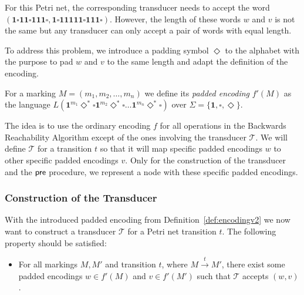 For this Petri net, the corresponding transducer needs to accept the word \break ${(\bm{1 \square 11 \square 111 \square},\bm{1 \square 11111 \square 111 \square})}$. However, the length of these words $w$ and $v$ is not the same but any transducer can only accept a pair of words with equal length. 

To address this problem, we introduce a padding symbol $\Diamond$ to the alphabet with the purpose to pad $w$ and $v$ to the same length and adapt the definition of the encoding.

\begin{definition}\label{def:encodingv2}
For a marking $M = (m_{1},m_{2},\dots,m_{n})$ we define its \emph{padded encoding} $f'(M)$ as the language $L(\bm{1}^{m_{1}} \Diamond^{\bm{*}} \square \bm{1}^{m_{2}} \Diamond^{\bm{*}}  \square \ldots \bm{1}^{m_{n}} \Diamond^{\bm{*}}  \square)$ over $\Sigma = \{\bm{1}, \square, \Diamond \}$.
\end{definition}

The idea is to use the ordinary encoding $f$ for all operations in the Backwards Reachability Algorithm except of the ones involving the transducer $\mathcal{T}$. We will define $\mathcal{T}$ for a transition $t$ so that it will map specific padded encodings $w$ to other specific padded encodings $v$. Only for the construction of the transducer and the $\operatorname{\textsf{pre}}$ procedure, we represent a node with these specific padded encodings. 



 



\subsubsection{Construction of the Transducer}

With the introduced padded encoding from Definition~\autoref{def:encodingv2} we now want to construct a transducer $\mathcal{T}$ for a Petri net transition $t$. The following property should be satisfied:
\begin{itemize}[-,noitemsep]
\item For all markings $M,M'$ and transition $t$, where $M \xrightarrow{t} M'$, there exist some padded encodings $w \in f'(M)$ and $v \in f'(M')$ such that $\mathcal{T}$ accepts $(w,v)$.
\end{itemize}



